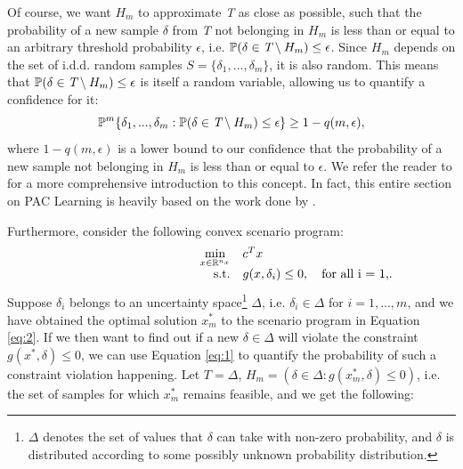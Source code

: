 \documentclass[11pt]{article}
\begin{document}
Of course, we want $H_{m}$ to approximate \emph{T} as close as possible, such that the probability of a new sample $\delta$ from \emph{T} not belonging in $H_{m}$ is less than or equal to an arbitrary threshold probability $\epsilon$, i.e. $\mathbb{P}(\delta \in \emph{T} \setminus H_{m}) \leq \epsilon$. Since $H_{m}$ depends on the set of i.d.d. random samples $S = \{\delta_{1},...,\delta_{m}\}$, it is also random. This means that $\mathbb{P}(\delta \in \emph{T} \setminus H_{m}) \leq \epsilon$ is itself a random variable, allowing us to quantify a confidence for it:
\begin{equation}
	\label{eq:1}
	\mathbb{P}^{m} \{\delta_{1},...,\delta_{m}: \mathbb{P}(\delta \in \emph{T} \setminus H_{m}) \leq \epsilon \} \geq 1 - q(m,\epsilon),
\end{equation}
where $1 - q(m,\epsilon)$ is a lower bound to our confidence that the probability of a new sample not belonging in $H_{m}$ is less than or equal to $\epsilon$. We refer the reader to \cite{paclearning1} for a more comprehensive introduction to this concept. In fact, this entire section on PAC Learning is heavily based on the work done by \cite{paclearning1,romao2021tight,kostas}.

Furthermore, consider the following convex scenario program:
\begin{equation}
	\label{eq:2}
	\begin{array}{rrclcl}
	\displaystyle \min_{x \in \mathbb{R}^{n_{x}}} & \multicolumn{3}{l}{c^{T}x}\\
	\text{s.t.} & g(x,\delta_{i}) \leq 0, \quad \text{for all i = 1,...,m}.\\
	\end{array}
	\end{equation}
Suppose $\delta_{i}$ belongs to an uncertainty space\footnote{$\Delta$ denotes the set of values that $\delta$ can take with non-zero probability, and $\delta$ is distributed according to some possibly unknown probability distribution.} $\Delta$, i.e. $\delta_{i} \in \Delta$ for $i = 1,...,m$, and we have obtained the optimal solution $x^{*}_{m}$ to the scenario program in Equation \ref{eq:2}. If we then want to find out if a new $\delta\in \Delta$ will violate the constraint $g(x^{*},\delta) \leq 0$, we can use Equation \ref{eq:1} to quantify the probability of such a constraint violation happening. Let $T=\Delta$, $H_{m} = (\delta \in \Delta: g(x^{*}_{m},\delta) \leq 0)$, i.e. the set of samples for which $x^{*}_{m}$ remains feasible, and we get the following:
\end{document}
